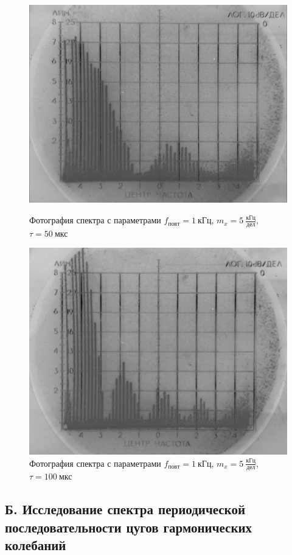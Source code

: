 \documentclass[a4paper,10pt]{article}
\begin{document}
\begin{figure}[h]
	\centering
	\includegraphics[scale=0.40]{Spectr_1}
	\caption{Фотография спектра с параметрами $f_{повт}=1~\text{кГц}$, $m_x=5~\frac{\text{кГц}}{\text{дел}}$, $\tau=50~\text{мкс}$} \label{Spectr_1}
	\includegraphics[scale=0.44]{Spectr_2}
	\caption{Фотография спектра с параметрами $f_{повт}=1~\text{кГц}$, $m_x=5~\frac{\text{кГц}}{\text{дел}}$, $\tau=100~\text{мкс}$} \label{Spectr_2}
\end{figure}

\subsection*{Б. Исследование спектра периодической последовательности цугов гармонических колебаний}
\end{document}
